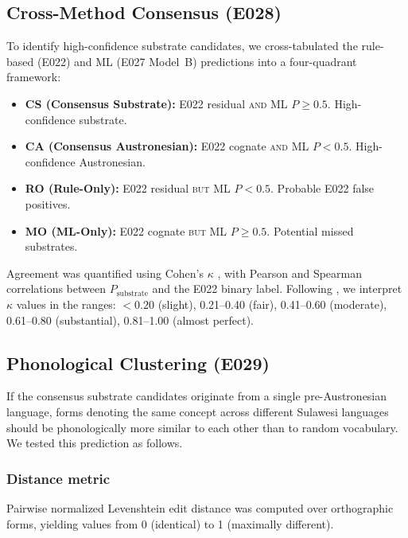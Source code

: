 \documentclass[12pt]{article}
\begin{document}
\subsection{Cross-Method Consensus (E028)}
\label{sec:consensus}

To identify high-confidence substrate candidates, we cross-tabulated the rule-based (E022) and ML (E027 Model~B) predictions into a four-quadrant framework:

\begin{itemize}
    \item \textbf{CS (Consensus Substrate):} E022 residual \textsc{and} ML $P \geq 0.5$. High-confidence substrate.
    \item \textbf{CA (Consensus Austronesian):} E022 cognate \textsc{and} ML $P < 0.5$. High-confidence Austronesian.
    \item \textbf{RO (Rule-Only):} E022 residual \textsc{but} ML $P < 0.5$. Probable E022 false positives.
    \item \textbf{MO (ML-Only):} E022 cognate \textsc{but} ML $P \geq 0.5$. Potential missed substrates.
\end{itemize}

Agreement was quantified using Cohen's $\kappa$ \citep{cohen1960}, with Pearson and Spearman correlations between $P_\mathrm{substrate}$ and the E022 binary label.
Following \citet{landis1977}, we interpret $\kappa$ values in the ranges: $< 0.20$ (slight), 0.21--0.40 (fair), 0.41--0.60 (moderate), 0.61--0.80 (substantial), 0.81--1.00 (almost perfect).

\subsection{Phonological Clustering (E029)}
\label{sec:clustering}

If the consensus substrate candidates originate from a single pre-Austronesian language, forms denoting the same concept across different Sulawesi languages should be phonologically more similar to each other than to random vocabulary.
We tested this prediction as follows.

\subsubsection{Distance metric}

Pairwise normalized Levenshtein edit distance \citep{levenshtein1966} was computed over orthographic forms, yielding values from 0 (identical) to 1 (maximally different).
\end{document}
